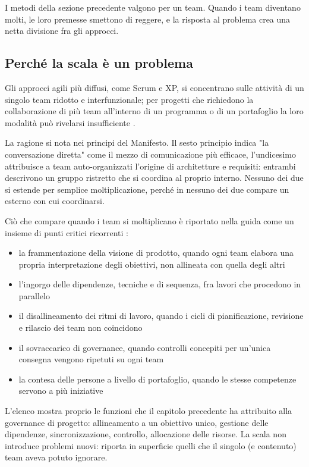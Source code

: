 I metodi della sezione precedente valgono per un team. Quando i team diventano
molti, le loro premesse smettono di reggere, e la risposta al problema crea una 
netta divisione fra gli approcci.

\subsection{Perch\'e la scala \`e un problema}

Gli approcci agili pi\`u diffusi, come
Scrum e XP, si concentrano sulle attivit\`a di un
singolo team ridotto e interfunzionale; per progetti che richiedono la
collaborazione di pi\`u team all'interno di un programma o di un portafoglio la
loro modalit\`a pu\`o rivelarsi insufficiente \cite{agilepracticeguide2}.

La ragione si nota nei principi del Manifesto. Il sesto principio indica "la
conversazione diretta" come il mezzo di comunicazione pi\`u efficace, l'undicesimo
attribuisce a team auto-organizzati l'origine di architetture e requisiti:
entrambi descrivono un gruppo ristretto che si coordina al proprio interno.
Nessuno dei due si estende per semplice moltiplicazione, perch\'e in nessuno dei
due compare un esterno con cui coordinarsi.

Ci\`o che compare quando i team si moltiplicano \`e riportato nella guida
come un insieme di punti critici ricorrenti \cite{agilepracticeguide2}:
\begin {itemize}
\item la frammentazione della visione di prodotto, quando ogni team elabora una
propria interpretazione degli obiettivi, non allineata con quella degli altri
\item l'ingorgo delle dipendenze, tecniche e di sequenza, fra lavori che
procedono in parallelo
\item il disallineamento dei ritmi di lavoro, quando i cicli di pianificazione,
revisione e rilascio dei team non coincidono
\item il sovraccarico di governance, quando controlli concepiti per un'unica
consegna vengono ripetuti su ogni team
\item la contesa delle persone a livello di portafoglio, quando le stesse
competenze servono a pi\`u iniziative
\end {itemize}

L'elenco mostra proprio le funzioni che il capitolo
precedente ha attribuito alla governance di progetto: allineamento a un
obiettivo unico, gestione delle dipendenze, sincronizzazione, controllo,
allocazione delle risorse. La scala non introduce problemi nuovi: riporta in
superficie quelli che il singolo (e contenuto) team aveva potuto ignorare.

